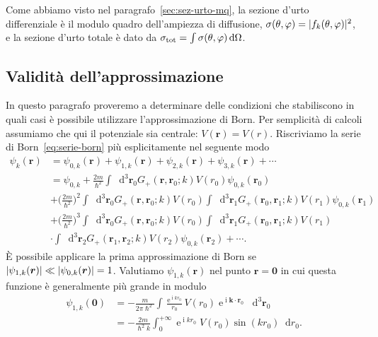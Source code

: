 \documentclass[a4paper,fleqn,twoside,12pt]{article}
\renewcommand{\phi}{\varphi}
\newcommand*{\dd}{\mathop{}\!\mathrm{d}} %
\DeclareMathOperator{\e}{\mathrm{e}} %
\DeclareMathOperator{\uimm}{\mathrm{i}} %
\DeclarePairedDelimiter{\abs}{\lvert}{\rvert}
\begin{document}
Come abbiamo visto nel paragrafo~\ref{sec:sez-urto-mq}, la sezione d'urto
differenziale è il modulo quadro dell'ampiezza di diffusione,
$\sigma(\theta,\phi) = \abs{f_{k}(\theta,\phi)}^{2}$, e la sezione d'urto totale
è dato da $\sigma_{\textup{tot}} = \int \sigma(\theta,\phi) \dd\Omega$.

\subsection{Validità dell'approssimazione}
\label{sec:validita-born}

In questo paragrafo proveremo a determinare delle condizioni che stabiliscono in
quali casi è possibile utilizzare l'approssimazione di Born.  Per semplicità di
calcoli assumiamo che qui il potenziale sia centrale: $V(\bm{r}) = V(r)$.
Riscriviamo la serie di Born~\eqref{eq:serie-born} più esplicitamente nel
seguente modo
\begin{equation}
  \label{eq:serie-born-esplicita}
  \begin{split}
    \psi_{k}(\bm{r}) &= \psi_{0,k}(\bm{r}) + \psi_{1,k}(\bm{r}) +
    \psi_{2,k}(\bm{r}) + \psi_{3,k}(\bm{r}) + \cdots \\
    &=\psi_{0,k} + \frac{2 m}{\hslash^{2}}\int\dd^{3}\bm{r}_{0}
    G_{+}(\bm{r},\bm{r}_{0};k) V(r_{0}) \psi_{0,k}(\bm{r}_{0}) \\
    &+ \bigg(\frac{2m}{\hslash^{2}}\bigg)^{2}
    \int\dd^{3}\bm{r}_{0}G_{+}(\bm{r},\bm{r}_{0};k)
    V(r_{0})\int\dd^{3}\bm{r}_{1} G_{+}(\bm{r}_{0},\bm{r}_{1};k) V(r_{1})
    \psi_{0,k}(\bm{r}_{1}) \\
    &+ \bigg(\frac{2m}{\hslash^{2}}\bigg)^{3}
    \int\dd^{3}\bm{r}_{0}G_{+}(\bm{r},\bm{r}_{0};k)
    V(r_{0})\int\dd^{3}\bm{r}_{1} G_{+}(\bm{r}_{0},\bm{r}_{1};k) V(r_{1}) \\
    &\cdot\int\dd^{3}\bm{r}_{2} G_{+}(\bm{r}_{1},\bm{r}_{2};k) V(r_{2})
    \psi_{0,k}(\bm{r}_{2}) + \cdots.
  \end{split}
\end{equation}
È possibile applicare la prima approssimazione di Born se
$\abs{\psi_{1,k}(\bm{r})} \ll \abs{\psi_{0,k}(\bm{r})} = 1$.  Valutiamo
$\psi_{1,k}(\bm{r})$ nel punto $\bm{r} = \bm{0}$ in cui questa funzione è
generalmente più grande in modulo
\begin{equation}
  \label{eq:foobar}
  \begin{split}
    \psi_{1,k}(\bm{0}) &= -\frac{m}{2\pi\hslash^{2}}\int \frac{\e^{\uimm
        kr_{0}}}{r_{0}} V(r_{0}) \e^{\uimm \bm{k}\cdot\bm{r}_{0}}
    \dd^{3}\bm{r}_{0} \\
    &= -\frac{2m}{\hslash^{2}k} \int_{0}^{+\infty} \e^{\uimm kr_{0}}V(r_{0})
    \sin(kr_{0}) \dd r_{0}.
  \end{split}
\end{equation}
\end{document}
